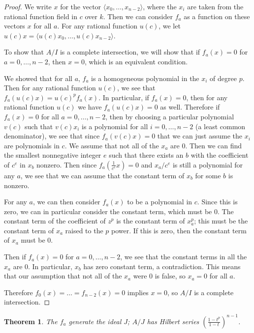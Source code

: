 \documentclass{article}
\numberwithin{equation}{section}
\newtheorem{theorem}[equation]{Theorem}
\begin{document}
\begin{proof} 

We write $x$ for the vector $\langle x_0,\dots, x_{n-2} \rangle$, where the $x_i$ are taken from the rational function field in $c$ over $k$. Then we can consider $f_a$ as a function on these vectors $x$ for all $a$. For any rational function $u( c)$, we let $u(c )x=\langle u(c )x_0,\dots, u(c )x_{n-2}\rangle$. 

To show that $A/I$ is a complete intersection, we will show that if $f_a(x)=0$ for $a=0,\dots,n-2$, then $x=0$, which is an equivalent condition. 

We showed that for all $a$, $f_a$ is a homogeneous polynomial in the $x_i$ of degree $p$. Then for any rational function $u(c )$, we see that $f_a(u(c )x)=u(c )^pf_a(x)$. In particular, if $f_a(x)=0$, then for any rational function $u(c )$ we have $f_a(u(c )x)=0$ as well. Therefore if $f_a(x) = 0$ for all $a=0,\dots,n-2$, then by choosing a particular polynomial $v(c )$ such that $v(c )x_i$ is a polynomial for all $i=0,\dots,n-2$ (a least common denominator), we see that since $f_a(v(c )x)=0$ that we can just assume the $x_i$ are polynomials in $c$. We assume that not all of the $x_a$ are $0$. Then we can find the smallest nonnegative integer $e$ such that there exists an $b$ with the coefficient of $c^e$ in $x_b$ nonzero. Then since $f_a(\frac{1}{c^e}x)=0$ and $x_a/c^e$ is still a polynomial for any $a$, we see that we can assume that the constant term of $x_b$ for some $b$ is nonzero. 

For any $a$, we can then consider $f_a(x)$ to be a polynomial in $c$. Since this is zero, we can in particular consider the constant term, which must be $0$. The constant term of the coefficient of $z^p$ is the constant term of $x_a^p$; this must be the constant term of $x_a$ raised to the $p$ power. If this is zero, then the constant term of $x_a$ must be $0$. 

Then if $f_a(x) =0$ for $a=0,\dots,n-2$, we see that the constant terms in all the $x_a$ are $0$. In particular, $x_b$ has zero constant term, a contradiction. This means that our assumption that not all of the $x_a$ were $0$ is false, so $x_a=0$ for all $a$. 

Therefore $f_0(x) = \dots = f_{n-2}(x)=0$ implies $x=0$, so $A/I$ is a complete intersection.
\end{proof}

\begin{theorem} The $f_a$ generate the ideal $J$; $A/J$ has Hilbert series $\left(\frac{1-t^p}{1-t}\right)^{n-1}$. 
\end{theorem}
\end{document}
